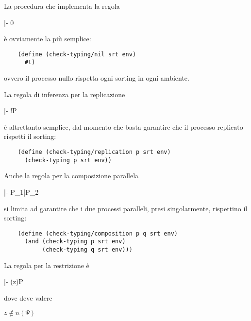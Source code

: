 La procedura che implementa la regola

\begin{pilisting}
    \inference[nil ]
      {}
      {\Psi |- 0}
\end{pilisting}

\`e ovviamente la pi\`u semplice:

\begin{lstlisting}
    (define (check-typing/nil srt env)
      #t)
\end{lstlisting}

ovvero il processo nullo rispetta ogni sorting in ogni ambiente.

La regola di inferenza per la replicazione

\begin{pilisting}
      {\Psi |- !P}
\end{pilisting}

\`e altrettanto semplice, dal momento che basta garantire che il
processo replicato rispetti il sorting:

\begin{lstlisting}
    (define (check-typing/replication p srt env)
      (check-typing p srt env))
\end{lstlisting}

Anche la regola per la composizione parallela

\begin{pilisting}
      {\Psi |- P_1|P_2}
\end{pilisting}

si limita ad garantire che i due processi paralleli, presi singolarmente,
rispettino il sorting:

\begin{lstlisting}
    (define (check-typing/composition p q srt env)
      (and (check-typing p srt env)
           (check-typing q srt env)))
\end{lstlisting}

La regola per la restrizione \`e

\begin{pilisting}
      {\Psi |- (z)P}
\end{pilisting}

dove deve valere

\begin{pilisting}
$
    z \notin n(\Psi)
$
\end{pilisting}

